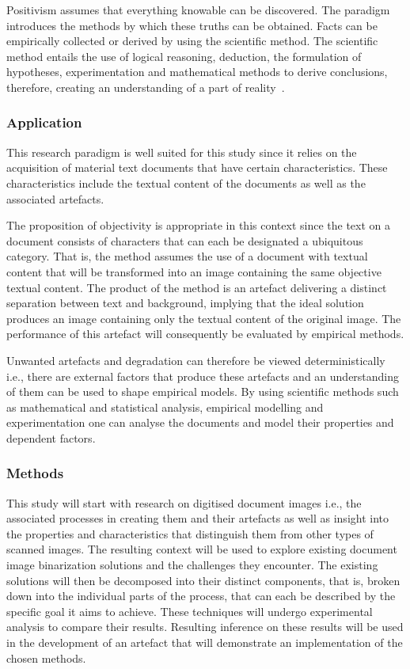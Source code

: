 \documentclass[a4paper, 12pt]{report}
\begin{document}
Positivism assumes that everything knowable can be discovered. The paradigm
introduces the methods by which these truths can be obtained. Facts can be
empirically collected or derived by using the scientific method. The scientific
method entails the use of logical reasoning, deduction, the formulation of
hypotheses, experimentation and mathematical methods to derive conclusions,
therefore, creating an understanding of a part of
reality~\cite{kivunja2017understanding}.

\subsubsection{Application}
This research paradigm is well suited for this study since it relies on the
acquisition of material text documents that have certain characteristics. These
characteristics include the textual content of the documents as well as the
associated artefacts.\par

The proposition of objectivity is appropriate in this context since the text on
a document consists of characters that can each be designated a ubiquitous
category. That is, the method assumes the use of a document with textual
content that will be transformed into an image containing the same objective
textual content. The product of the method is an artefact delivering a distinct
separation between text and background, implying that the ideal solution
produces an image containing only the textual content of the original image.
The performance of this artefact will consequently be evaluated by empirical
methods.\par

Unwanted artefacts and degradation can therefore be viewed deterministically
i.e., there are external factors that produce these artefacts and an
understanding of them can be used to shape empirical models. By using
scientific methods such as mathematical and statistical analysis, empirical
modelling and experimentation one can analyse the documents and model their
properties and dependent factors.

\subsubsection{Methods}
This study will start with research on digitised document images i.e., the
associated processes in creating them and their artefacts as well as insight
into the properties and characteristics that distinguish them from other types
of scanned images. The resulting context will be used to explore existing
document image binarization solutions and the challenges they encounter. The
existing solutions will then be decomposed into their distinct components, that
is, broken down into the individual parts of the process, that can each be
described by the specific goal it aims to achieve. These techniques will
undergo experimental analysis to compare their results. Resulting inference on
these results will be used in the development of an artefact that will
demonstrate an implementation of the chosen methods. \newpage
\end{document}
